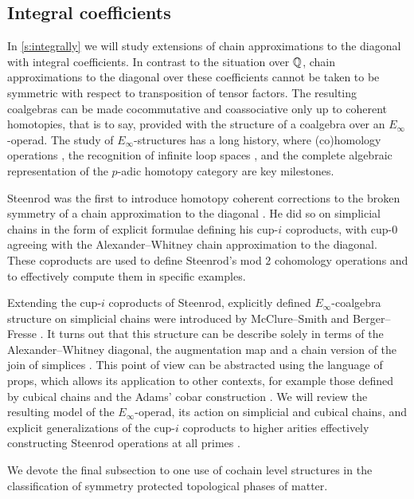 \subsection*{Integral coefficients}

In \cref{s:integrally} we will study extensions of chain approximations to the diagonal with integral coefficients.
In contrast to the situation over $\mathbb{Q}$, chain approximations to the diagonal over these coefficients cannot be taken to be symmetric with respect to transposition of tensor factors.
The resulting coalgebras can be made cocommutative and coassociative only up to coherent homotopies, that is to say, provided with the structure of a coalgebra over an $E_\infty$-operad.
The study of $E_\infty$-structures has a long history, where (co)homology operations \cite{steenrod1962cohomology, may1970general}, the recognition of infinite loop spaces \cite{boardman1973homotopy, may1972geometry}, and the complete algebraic representation of the $p$-adic homotopy category \cite{mandell2001padic} are key milestones.

Steenrod was the first to introduce homotopy coherent corrections to the broken symmetry of a chain approximation to the diagonal \cite{steenrod1947products}.
He did so on simplicial chains in the form of explicit formulae defining his cup-$i$ coproducts, with \mbox{cup-$0$} agreeing with the Alexander--Whitney chain approximation to the diagonal.
These coproducts are used to define Steenrod's mod $2$ cohomology operations and to effectively compute them in specific examples.

Extending the cup-$i$ coproducts of Steenrod, explicitly defined $E_\infty$-coalgebra structure on simplicial chains were introduced by McClure--Smith \cite{mcclure2003multivariable} and Berger--Fresse \cite{berger2004combinatorial}.
It turns out that this structure can be describe solely in terms of the Alexander--Whitney diagonal, the augmentation map and a chain version of the join of simplices \cite{medina2020prop1}.
This point of view can be abstracted using the language of props, which allows its application to other contexts, for example those defined by cubical chains \cite{medina2021cubical} and the Adams' cobar construction \cite{medina2021cobar}.
We will review the resulting model of the $E_\infty$-operad, its action on simplicial and cubical chains, and explicit generalizations of the cup-$i$ coproducts to higher arities effectively constructing Steenrod operations at all primes \cite{medina2021may_st}.

We devote the final subsection to one use of cochain level structures in the classification of symmetry protected topological phases of matter.
